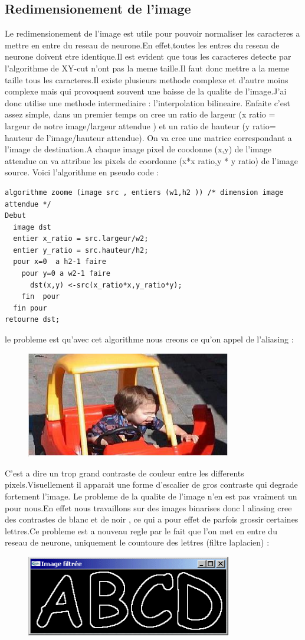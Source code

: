 \subsection{Redimensionement de l'image }
Le redimensionement de l'image est utile pour pouvoir normaliser les caracteres a mettre en entre du reseau de neurone.En effet,toutes les entres du reseau de neurone doivent etre identique.Il est evident que tous les caracteres detecte par l'algorithme de XY-cut n'ont pas la meme taille.Il faut donc mettre a la meme taille tous les caracteres.Il existe plusieurs methode complexe et d'autre moins complexe mais qui provoquent souvent une baisse de la qualite de l'image.J'ai donc utilise une methode intermediaire : l'interpolation bilineaire.
Enfaite c'est assez simple, dans un premier temps on cree un ratio de largeur (x ratio = largeur de notre image/largeur attendue ) et un ratio de hauteur (y ratio= hauteur de l'image/hauteur attendue). On va cree une matrice correspondant a l'image de destination.A chaque image pixel de coodonne (x,y) de l'image attendue on va attribue les pixels de coordonne (x*x ratio,y * y ratio) de l'image source.
Voici l'algorithme en pseudo code :
\begin{lstlisting}
algorithme zoome (image src , entiers (w1,h2 )) /* dimension image attendue */
Debut
  image dst
  entier x_ratio = src.largeur/w2;
  entier y_ratio = src.hauteur/h2;
  pour x=0  a h2-1 faire
    pour y=0 a w2-1 faire
      dst(x,y) <-src(x_ratio*x,y_ratio*y);
    fin  pour
  fin pour
retourne dst; 
\end{lstlisting}
le probleme  est qu'avec cet algorithme nous creons ce qu'on appel de l'aliasing :
\begin{figure}[h]
    \centering
    \includegraphics[width =0.80\textwidth]{aliasing.jpg}
\end{figure}
C'est a dire un trop grand contraste de couleur entre les differents pixels.Visuellement il apparait une forme d'escalier de gros contraste qui degrade fortement l'image. Le probleme de la qualite de l'image n'en est pas vraiment un pour nous.En effet nous travaillons sur des images binarises donc l aliasing cree des contrastes de blanc et de noir , ce qui a pour effet de parfois grossir certaines lettres.Ce probleme est a nouveau regle par le fait que l'on met en entre du reseau de neurone, uniquement le countoure des lettres (filtre laplacien) :
\begin{figure}[h]
    \centering
    \includegraphics[width =0.80\textwidth]{ABCD.png}
\end{figure}

